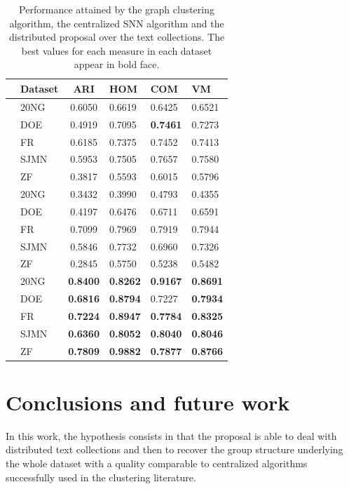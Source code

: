 \documentclass[a4paper]{article}
\begin{document}
\begin{table}[!htbp]
\centering
\begin{tabular}{cl|clll}
&\textbf{Dataset} & \textbf{ARI}  & \textbf{HOM} & \textbf{COM} & \textbf{VM} \\ \hline
\parbox[t]{2mm}{}&20NG  &  0.6050 &  0.6619 &  0.6425 &  0.6521  \\
&DOE     & 0.4919  &  0.7095 &  \textbf{0.7461} &  0.7273  \\
&FR        & 0.6185  &  0.7375 &  0.7452 &  0.7413  \\
&SJMN   & 0.5953  &  0.7505 &  0.7657 &  0.7580  \\
&ZF        & 0.3817  &  0.5593 &  0.6015 &  0.5796  \\ \hline
\parbox[t]{2mm}{} &20NG    & 0.3432 & 0.3990 & 0.4793 & 0.4355\\
&DOE     & 0.4197 &  0.6476 & 0.6711 & 0.6591\\
&FR        & 0.7099 &  0.7969 & 0.7919 & 0.7944\\
&SJMN   & 0.5846 & 0.7732 & 0.6960 & 0.7326\\
&ZF        & 0.2845 &  0.5750 & 0.5238 & 0.5482\\ \hline
\parbox[t]{2mm}{} &20NG    & \textbf{0.8400} & \textbf{0.8262} & \textbf{0.9167} & \textbf{0.8691}  \\
&DOE     & \textbf{0.6816} & \textbf{0.8794} & 0.7227 & \textbf{0.7934}  \\
&FR        & \textbf{0.7224} & \textbf{0.8947} & \textbf{0.7784} & \textbf{0.8325}  \\
&SJMN   & \textbf{0.6360} & \textbf{0.8052} & \textbf{0.8040} & \textbf{0.8046}  \\
&ZF        & \textbf{0.7809} & \textbf{0.9882} & \textbf{0.7877} & \textbf{0.8766}  \\ \hline
\end{tabular}
\caption{Performance attained by the graph clustering algorithm, the centralized SNN algorithm and the  distributed proposal  over the text collections. The best values for each measure in each dataset appear in bold face.}
\label{table:results}
\end{table}



\section{Conclusions and future work}
In this work, the hypothesis consists in that the proposal is able to deal with distributed text collections and then to recover the group structure underlying the whole dataset with a quality comparable to centralized algorithms successfully used in the clustering literature.
\end{document}
